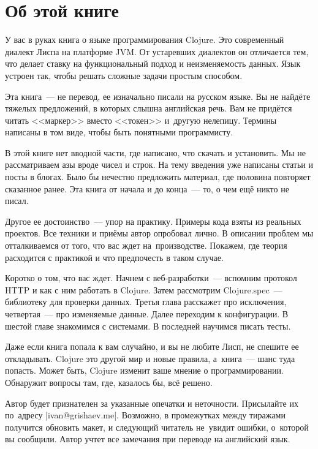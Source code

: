 \chapter*{Об этой книге}

У вас в руках книга о языке программирования Clojure. Это современный диалект
Лиспа на платформе JVM. От устаревших диалектов он отличается тем, что делает
ставку на функциональный подход и неизменяемость данных. Язык устроен так, чтобы
решать сложные задачи простым способом.

Эта книга~--- не перевод, ее изначально писали на русском языке. Вы не найд\"{е}те
тяжелых предложений, в которых слышна английская речь. Вам не прид\"{е}тся читать
<<маркер>> вместо <<токен>> и~другую нелепицу. Термины написаны в том виде,
чтобы быть понятными программисту.

В этой книге нет вводной части, где написано, что скачать и установить. Мы не
рассматриваем азы вроде чисел и строк. На тему введения уже написаны статьи и
посты в блогах. Было бы нечестно предложить материал, где половина повторяет
сказанное ранее. Эта книга от начала и до конца~--- то, о чем ещ\"{е} никто не
писал.

Другое ее достоинство~--- упор на практику. Примеры кода взяты из реальных
проектов. Все техники и при\"{е}мы автор опробовал лично. В описании проблем мы
отталкиваемся от того, что вас ждет на~производстве. Покажем, где теория
расходится с практикой и что предпочесть в таком случае.

Коротко о том, что вас ждет. Начнем с веб-разработки~--- вспомним протокол HTTP
и как с ним работать в Clojure. Затем рассмотрим Clojure.spec~--- библиотеку для
проверки данных. Третья глава расскажет про исключения, четвертая~--- про
изменяемые данные. Далее переходим к конфигурации. В шестой главе знакомимся с
системами. В последней научимся писать тесты.

Даже если книга попала к вам случайно, и вы не любите Лисп, не спешите ее
откладывать. Clojure это другой мир и новые правила, а~книга~--- шанс туда
попасть. Может быть, Clojure изменит ваше мнение о программировании. Обнаружит
вопросы там, где, казалось бы, вс\"{е} решено.

Автор будет признателен за указанные опечатки и неточности. Присылайте их
по~адресу \spverb|ivan@grishaev.me|. Возможно, в промежутках между тиражами
получится обновить макет, и следующий читатель не~увидит ошибки, о~которой вы
сообщили. Автор учтет все замечания при переводе на английский язык.

